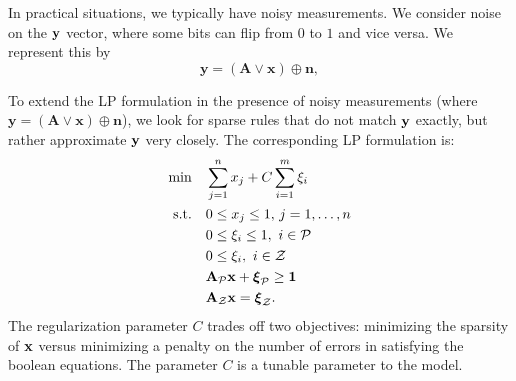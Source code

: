 In practical situations, we typically have noisy measurements.
We consider noise on the $\mathbf{y}$ vector, where some bits can flip from
$0$ to $1$ and vice versa. We represent this by
\begin{equation}
\label{eq:noisyforwardtest}
	\mathbf{y} = (\mathbf{A} \lor \mathbf{x}) \oplus \mathbf{n},
\end{equation}

To extend the LP formulation in the presence of noisy measurements (where $\mathbf{y} = (\mathbf{A} \lor \mathbf{x}) \oplus \mathbf{n}$), we look
for sparse rules that do not match $\mathbf{y}$ exactly, but rather approximate
$\mathbf{y}$ very closely. The corresponding LP formulation is:
\begin{align}
\label{eq:booleanl1minLPslack}
	\min\quad &\sum_{j=1}^{n} x_j + C\sum_{i=1}^{m}\xi_i\\
	\textrm{s.t.\quad} & 0 \le x_j \le 1,\,j = 1,\ldots,n\nonumber\\
		& 0 \le \xi_i \le 1, ~i \in \mathcal{P} \nonumber\\
		& 0 \le \xi_i, ~i \in \mathcal{Z}\nonumber\\
		& \mathbf{A}_{\mathcal{P}}\mathbf{x} + \boldsymbol{\xi}_{\mathcal{P}} \ge \mathbf{1}\nonumber\\
		& \mathbf{A}_{\mathcal{Z}}\mathbf{x} = \boldsymbol{\xi}_{\mathcal{Z}}.\nonumber
\end{align}
The regularization parameter $C$ trades off two objectives: minimizing the sparsity of $\mathbf{x}$ versus minimizing a penalty on the number of errors in satisfying the boolean equations. The parameter $C$ is a tunable parameter to the model.



